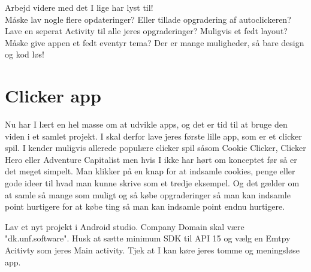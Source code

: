 \pagebreak

\begin{exercise}
	Arbejd videre med det I lige har lyst til! \\
	Måske lav nogle flere opdateringer? Eller tillade opgradering af autoclickeren? Lave en seperat Activity til alle jeres opgraderinger?
	Muligvis et fedt layout? Måske give appen et fedt eventyr tema? Der er mange muligheder, så bare design og kod løs!
\end{exercise}\section{Clicker app}
Nu har I lært en hel masse om at udvikle apps, og det er tid til at bruge den viden i et samlet projekt. I skal derfor lave jeres første lille app, som er et clicker spil. I kender muligvis allerede populære clicker spil såsom Cookie Clicker, Clicker Hero eller Adventure Capitalist men hvis I ikke har hørt om konceptet før så er det meget simpelt. Man klikker på en knap for at indsamle cookies, penge eller gode ideer til hvad man kunne skrive som et tredje eksempel. Og det gælder om at samle så mange som muligt og så købe opgraderinger så man kan indsamle point hurtigere for at købe ting så man kan indsamle point endnu hurtigere.

\begin{exercise}
	Lav et nyt projekt i Android studio. Company Domain skal være "dk.unf.software". Husk at sætte minimum SDK til API 15 og vælg en Emtpy Acitivty som jeres Main activity.
	Tjek at I kan køre jeres tomme og meningsløse app.
\end{exercise}

